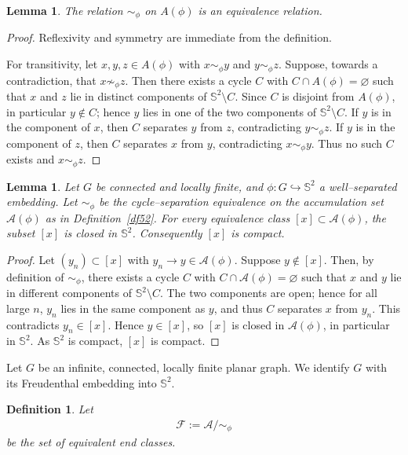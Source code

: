 \documentclass[11pt]{amsart}
\theoremstyle{plain}
\newtheorem{definition}[theorem]{Definition}
\newtheorem{lemma}[theorem]{Lemma}
\numberwithin{equation}{section}
\numberwithin{figure}{section}
\begin{document}
\begin{lemma}\label{lem:equiv}
The relation $\sim_\phi$ on $A(\phi)$ is an equivalence relation.
\end{lemma}

\begin{proof}
Reflexivity and symmetry are immediate from the definition.

For transitivity, let $x,y,z\in A(\phi)$ with $x\sim_\phi y$ and $y\sim_\phi z$.
Suppose, towards a contradiction, that $x\not\sim_\phi z$. Then there exists a
cycle $C$ with $C\cap A(\phi)=\varnothing$ such that $x$ and $z$ lie in distinct
components of $\mathbb S^2\!\setminus C$. Since $C$ is disjoint from $A(\phi)$,
in particular $y\notin C$; hence $y$ lies in one of the two components of
$\mathbb S^2\!\setminus C$. If $y$ is in the component of $x$, then $C$ separates
$y$ from $z$, contradicting $y\sim_\phi z$. If $y$ is in the component of $z$,
then $C$ separates $x$ from $y$, contradicting $x\sim_\phi y$. Thus no such $C$
exists and $x\sim_\phi z$.
\end{proof}

\begin{lemma}\label{le64}
Let $G$ be connected and locally finite, and $\phi:G\hookrightarrow\mathbb S^2$ a well–separated embedding. 
Let $\sim_\phi$ be the cycle–separation equivalence on the accumulation set $\mathcal{A}(\phi)$ as in Definition~\ref{df52}.
For every equivalence class $[x]\subset \mathcal{A}(\phi)$, the subset $[x]$ is closed in $\mathbb S^2$. 
Consequently $[x]$ is compact.
\end{lemma}

\begin{proof}
Let $(y_n)\subset [x]$ with $y_n\to y\in \mathcal{A}(\phi)$. Suppose $y\notin [x]$. 
Then, by definition of $\sim_\phi$, there exists a cycle $C$ with $C\cap \mathcal{A}(\phi)=\varnothing$ such that $x$ and $y$ lie in different components of $\mathbb S^2\setminus C$. The two components are open; hence for all large $n$, $y_n$ lies in the same component as $y$, and thus $C$ separates $x$ from $y_n$. This contradicts $y_n\in[x]$. Hence $y\in[x]$, so $[x]$ is closed in $\mathcal{A}(\phi)$, in particular in $\mathbb S^2$. As $\mathbb S^2$ is compact, $[x]$ is compact.
\end{proof}

Let $G$ be an infinite, connected, locally finite planar graph. We identify $G$ with its Freudenthal embedding into $\mathbb{S}^2$.

\begin{definition}Let
\begin{align*}
\mathcal{F}:=\mathcal{A}/\sim_{\phi}
\end{align*}
be the set of equivalent end classes.

\end{definition}
\end{document}
